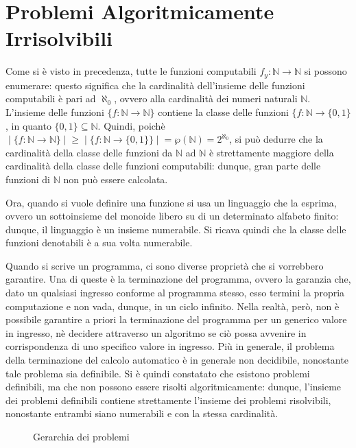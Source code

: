   \section{Problemi Algoritmicamente Irrisolvibili}
  Come si è visto in precedenza, tutte le funzioni computabili \(f_y:\mathbb{N}\to\mathbb{N}\) si possono enumerare: questo significa che la cardinalità dell'insieme delle funzioni computabili è pari ad \(\aleph_0\), ovvero alla cardinalità dei numeri naturali \(\mathbb{N}\). L'insieme delle funzioni \(\{f:\mathbb{N}\to\mathbb{N}\}\) contiene la classe delle funzioni \(\{f:\mathbb{N}\to\{0,1\}\), in quanto \(\{0,1\}\subseteq \mathbb{N}\). Quindi, poichè \(\;|\;\{f:\mathbb{N}\to\mathbb{N}\}\;|\; \ge \;|\;\{f:\mathbb{N}\to\{0,1\}\}\;|\; = \wp (\mathbb{N}) = 2^{\aleph_0}\), si può dedurre che la cardinalità della classe delle funzioni da \(\mathbb{N}\) ad \(\mathbb{N}\) è strettamente maggiore della cardinalità della classe delle funzioni computabili: dunque, gran parte delle funzioni di \(\mathbb{N}\) non può essere calcolata. 

  Ora, quando si vuole definire una funzione si usa un linguaggio che la esprima, ovvero un sottoinsieme del monoide libero su di un determinato alfabeto finito: dunque, il linguaggio è un insieme numerabile. Si ricava quindi che la classe delle funzioni denotabili è a sua volta numerabile.

  Quando si scrive un programma, ci sono diverse proprietà che si vorrebbero garantire. Una di queste è la terminazione del programma, ovvero la garanzia che, dato un qualsiasi ingresso conforme al programma stesso, esso termini la propria computazione e non vada, dunque, in un ciclo infinito. Nella realtà, però, non è possibile garantire a priori la terminazione del programma per un generico valore in ingresso, nè decidere attraverso un algoritmo se ciò possa avvenire in corrispondenza di uno specifico valore in ingresso. Più in generale, il problema della terminazione del calcolo automatico è in generale non decidibile, nonostante tale problema sia definibile.
  Si è quindi constatato che esistono problemi definibili, ma che non possono essere risolti algoritmicamente: dunque, l'insieme dei problemi definibili contiene strettamente l'insieme dei problemi risolvibili, nonostante entrambi siano numerabili e con la stessa cardinalità.

  \begin{figure}[!h]
    \begin{center}    
    \end{center}
    \caption{Gerarchia dei problemi}    
  \end{figure}

